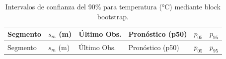\documentclass[
  spanish,
  us-letterpaper,
]{scrreprt}
\numberwithin{equation}{section}
\begin{document}
\begin{longtable}[]{@{}
  >{\raggedright\arraybackslash}p{}
  >{\raggedright\arraybackslash}p{}
  >{\raggedright\arraybackslash}p{}
  >{\raggedright\arraybackslash}p{}
  >{\raggedright\arraybackslash}p{}
  >{\raggedright\arraybackslash}p{}@{}}
\caption{Intervalos de confianza del 90\% para temperatura (°C) mediante
block bootstrap.}\label{tbl-incertidumbre-temp}\tabularnewline
\toprule\noalign{}
\begin{minipage}[b]{\linewidth}\raggedright
Segmento
\end{minipage} & \begin{minipage}[b]{\linewidth}\raggedright
\(s_m\) (m)
\end{minipage} & \begin{minipage}[b]{\linewidth}\raggedright
Último Obs.
\end{minipage} & \begin{minipage}[b]{\linewidth}\raggedright
Pronóstico (p50)
\end{minipage} & \begin{minipage}[b]{\linewidth}\raggedright
\(p_{05}\)
\end{minipage} & \begin{minipage}[b]{\linewidth}\raggedright
\(p_{95}\)
\end{minipage} \\
\midrule\noalign{}
\endfirsthead
\toprule\noalign{}
\begin{minipage}[b]{\linewidth}\raggedright
Segmento
\end{minipage} & \begin{minipage}[b]{\linewidth}\raggedright
\(s_m\) (m)
\end{minipage} & \begin{minipage}[b]{\linewidth}\raggedright
Último Obs.
\end{minipage} & \begin{minipage}[b]{\linewidth}\raggedright
Pronóstico (p50)
\end{minipage} & \begin{minipage}[b]{\linewidth}\raggedright
\(p_{05}\)
\end{minipage} & \begin{minipage}[b]{\linewidth}\raggedright
\(p_{95}\)
\end{minipage} \\

\end{longtable}
\end{document}
